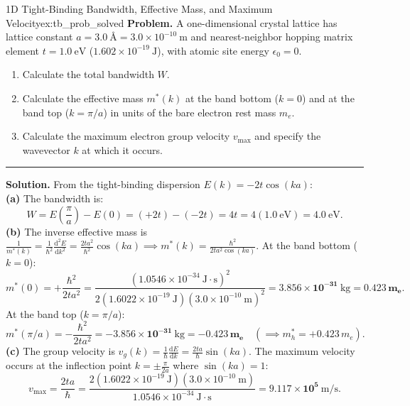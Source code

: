 \documentclass[11pt,a4paper]{article}
\newcommand{\dv}[2]{\frac{\mathrm{d}#1}{\mathrm{d}#2}}
\newcommand{\dvtwo}[2]{\frac{\mathrm{d}^2#1}{\mathrm{d}#2^2}}
\newcommand{\hb}{\hbar}
\begin{document}
\begin{examplebox}{1D Tight-Binding Bandwidth, Effective Mass, and Maximum Velocity}{ex:tb_prob_solved}
\textbf{Problem.} A one-dimensional crystal lattice has lattice constant $a = 3.0\ \text{\AA} = 3.0\times 10^{-10}\ \mathrm{m}$ and nearest-neighbor hopping matrix element $t = 1.0\ \mathrm{eV}$ ($1.602\times 10^{-19}\ \mathrm{J}$), with atomic site energy $\epsilon_0 = 0$.
\begin{enumerate}[noitemsep]
    \item Calculate the total bandwidth $W$.
    \item Calculate the effective mass $m^*(k)$ at the band bottom ($k = 0$) and at the band top ($k = \pi/a$) in units of the bare electron rest mass $m_e$.
    \item Calculate the maximum electron group velocity $v_{\max}$ and specify the wavevector $k$ at which it occurs.
\end{enumerate}
\vspace{0.2cm}\hrule\vspace{0.2cm}
\textbf{Solution.}
From the tight-binding dispersion $E(k) = -2t\cos(ka)$:\\
\textbf{(a)} The bandwidth is:
\[
    W = E\left(\frac{\pi}{a}\right) - E(0) = (+2t) - (-2t) = 4t = 4(1.0\ \mathrm{eV}) = \mathbf{4.0\ \mathrm{eV}}.
\]
\textbf{(b)} The inverse effective mass is $\frac{1}{m^*(k)} = \frac{1}{\hb^2}\dvtwo{E}{k} = \frac{2ta^2}{\hb^2}\cos(ka) \implies m^*(k) = \frac{\hb^2}{2ta^2\cos(ka)}$.
At the band bottom ($k = 0$):
\[
    m^*(0) = +\frac{\hb^2}{2ta^2} = \frac{(1.0546\times 10^{-34}\ \mathrm{J\cdot s})^2}{2(1.6022\times 10^{-19}\ \mathrm{J})(3.0\times 10^{-10}\ \mathrm{m})^2} = \mathbf{3.856\times 10^{-31}\ \mathrm{kg}} = \mathbf{0.423\,m_e}.
\]
At the band top ($k = \pi/a$):
\[
    m^*(\pi/a) = -\frac{\hb^2}{2ta^2} = \mathbf{-3.856\times 10^{-31}\ \mathrm{kg}} = \mathbf{-0.423\,m_e} \quad (\implies m_h^* = +0.423\,m_e).
\]
\textbf{(c)} The group velocity is $v_g(k) = \frac{1}{\hb}\dv{E}{k} = \frac{2ta}{\hb}\sin(ka)$. The maximum velocity occurs at the inflection point $k = \pm\frac{\pi}{2a}$ where $\sin(ka) = 1$:
\[
    v_{\max} = \frac{2ta}{\hb} = \frac{2(1.6022\times 10^{-19}\ \mathrm{J})(3.0\times 10^{-10}\ \mathrm{m})}{1.0546\times 10^{-34}\ \mathrm{J\cdot s}} = \mathbf{9.117\times 10^5\ \mathrm{m/s}}.
\]
\end{examplebox}
\end{document}
